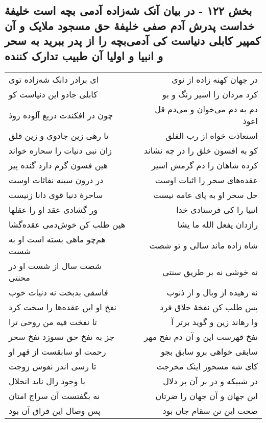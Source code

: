 \begin{center}
\section*{بخش ۱۲۲ - در بیان آنک شه‌زاده آدمی بچه است خلیفهٔ خداست پدرش آدم صفی خلیفهٔ حق مسجود ملایک و آن کمپیر کابلی دنیاست کی آدمی‌بچه را از پدر ببرید به سحر و انبیا و اولیا آن طبیب تدارک کننده}
\label{sec:sh122}
\begin{longtable}{l p{0.5cm} r}
ای برادر دانک شه‌زاده توی
&&
در جهان کهنه زاده از نوی
\\
کابلی جادو این دنیاست کو
&&
کرد مردان را اسیر رنگ و بو
\\
چون در افکندت دریغ آلوده روذ
&&
دم به دم می‌خوان و می‌دم قل اعوذ
\\
تا رهی زین جادوی و زین قلق
&&
استعاذت خواه از رب الفلق
\\
زان نبی دنیات را سحاره خواند
&&
کو به افسون خلق را در چه نشاند
\\
هین فسون گرم دارد گنده پیر
&&
کرده شاهان را دم گرمش اسیر
\\
در درون سینه نفاثات اوست
&&
عقده‌های سحر را اثبات اوست
\\
ساحرهٔ دنیا قوی دانا زنیست
&&
حل سحر او به پای عامه نیست
\\
ور گشادی عقد او را عقلها
&&
انبیا را کی فرستادی خدا
\\
هین طلب کن خوش‌دمی عقده‌گشا
&&
رازدان یفعل الله ما یشا
\\
هم‌چو ماهی بسته است او به شست
&&
شاه زاده ماند سالی و تو شصت
\\
شصت سال از شست او در محنتی
&&
نه خوشی نه بر طریق سنتی
\\
فاسقی بدبخت نه دنیات خوب
&&
نه رهیده از وبال و از ذنوب
\\
نفخ او این عقده‌ها را سخت کرد
&&
پس طلب کن نفخهٔ خلاق فرد
\\
تا نفخت فیه من روحی ترا
&&
وا رهاند زین و گوید برتر آ
\\
جز به نفخ حق نسوزد نفخ سحر
&&
نفخ قهرست این و آن دم نفح مهر
\\
رحمت او سابقست از قهر او
&&
سابقی خواهی برو سابق بجو
\\
تا رسی اندر نفوس زوجت
&&
کای شه مسحور اینک مخرجت
\\
با وجود زال ناید انحلال
&&
در شبیکه و در بر آن پر دلال
\\
نه بگفتست آن سراج امتان
&&
این جهان و آن جهان را ضرتان
\\
پس وصال این فراق آن بود
&&
صحت این تن سقام جان بود
\\

\end{longtable}
\end{center}
